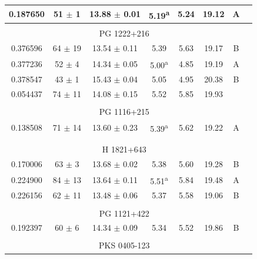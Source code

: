 \begin{longtable}{cccccccc}
            0.187650  &  51 $\pm$ 1  &  13.88 $\pm$ 0.01  &  5.19\textsuperscript{a}  &  5.24  &  19.12  &  A \\

            \hline \tabularnewline

            \multicolumn{7}{c}{PG 1222+216} \\ \hline 

            0.376596  &  64 $\pm$ 19  &  13.54 $\pm$ 0.11  &  5.39  &  5.63  &  19.17  &  B \\
            0.377236  &  52 $\pm$ 4  &  14.34 $\pm$ 0.05  &  5.00\textsuperscript{a}  &  4.85  &  19.19  &  A \\
            0.378547  &  43 $\pm$ 1  &  15.43 $\pm$ 0.04  &  5.05  &  4.95  &  20.38  &  B \\
            0.054437  &  74 $\pm$ 11  &  14.08 $\pm$ 0.15  &  5.52  &  5.85  &  19.93  &   \\

            \hline \tabularnewline

            \multicolumn{7}{c}{PG 1116+215} \\ \hline 

            0.138508  &  71 $\pm$ 14  &  13.60 $\pm$ 0.23  &  5.39\textsuperscript{a}  &  5.62  &  19.22  &  A \\

            \hline \tabularnewline \tabularnewline 

            \multicolumn{7}{c}{H 1821+643} \\ \hline 

            0.170006  &  63 $\pm$ 3  &  13.68 $\pm$ 0.02  &  5.38  &  5.60  &  19.28  &  B \\
            0.224900  &  84 $\pm$ 13  &  13.64 $\pm$ 0.11  &  5.51\textsuperscript{a}  &  5.84  &  19.48  &  A \\
            0.226156  &  62 $\pm$ 11  &  13.48 $\pm$ 0.06  &  5.37  &  5.58  &  19.06  &  B \\

            \hline \tabularnewline

            \multicolumn{7}{c}{PG 1121+422} \\ \hline 

            0.192397  &  60 $\pm$ 6  &  14.34 $\pm$ 0.09  &  5.34  &  5.52  &  19.86  &  B \\

            \hline \tabularnewline

            \multicolumn{7}{c}{PKS 0405-123} \\ \hline 


\end{longtable}
